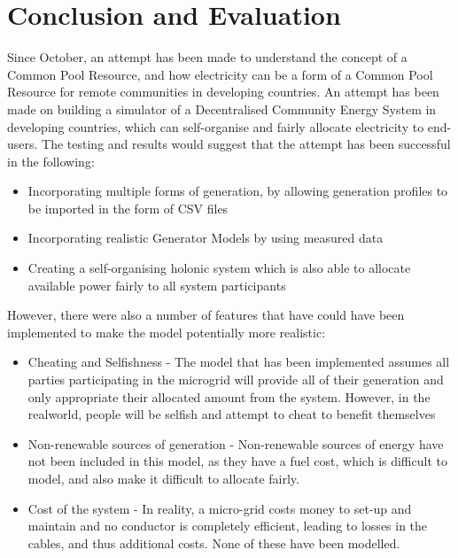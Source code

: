 \chapter{Conclusion and Evaluation}
\label{Conclusions}

Since October, an attempt has been made to understand the concept of a Common Pool Resource, and how electricity can be a form of a Common Pool Resource for remote communities in developing countries. An attempt has been made on building a simulator of a Decentralised Community Energy System in developing countries, which can self-organise and fairly allocate electricity to end-users. The testing and results would suggest that the attempt has been successful in the following:
\begin{itemize}
	\item Incorporating multiple forms of generation, by allowing generation profiles to be imported in the form of CSV files
	\item Incorporating realistic Generator Models by using measured data
	\item Creating a self-organising holonic system which is also able to allocate available power fairly to all system participants
\end{itemize}

However, there were also a number of features that have could have been implemented to make the model potentially more realistic:
\begin{itemize}
	\item Cheating and Selfishness - The model that has been implemented assumes all parties participating in the microgrid will provide all of their generation and only appropriate their allocated amount from the system. However, in the realworld, people will be selfish and attempt to cheat to benefit themselves  
	\item Non-renewable sources of generation - Non-renewable sources of energy have not been included in this model, as they have a fuel cost, which is difficult to model, and also make it difficult to allocate fairly. 
	\item Cost of the system - In reality, a micro-grid costs money to set-up and maintain and no conductor is completely efficient, leading to losses in the cables, and thus additional costs. None of these have been modelled.
\end{itemize}


